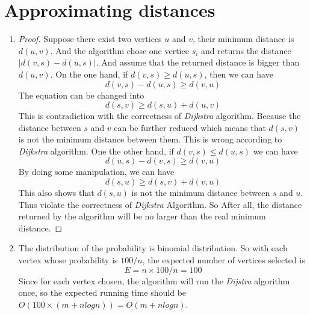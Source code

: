 \documentclass{article}
\begin{document}
	\section{Approximating distances}
		\begin{enumerate}
			\item \begin{proof}
				Suppose there exist two vertices $u$ and $v$, their minimum distance is $d(u, v)$. And the algorithm chose one vertice $s_i$ and returns the distance $|d(v, s) - d(u, s)|$. And assume that the returned distance is bigger than $d(u, v)$. On the one hand, if $d(v, s) \ge d(u, s)$, then we can have \begin{displaymath}
					d(v, s) - d(u, s) \ge d(v, u)
				\end{displaymath}
				The equation can be changed into \begin{displaymath}
					d(s, v) \ge d(s, u) + d(u, v)
				\end{displaymath}
				This is contradiction with the correctness of \emph{Dijkstra} algorithm. Because the distance between $s$ and $v$ can be further reduced which means that $d(s, v)$ is not the minimum distance between them. This is wrong according to \emph{Dijkstra} algorithm. \newline
				One the other hand, if $d(v, s) \le d(u, s)$ we can have \begin{displaymath}
					d(u, s) - d(v, s) \ge d(v, u)
				\end{displaymath}
				By doing some manipulation, we can have
				\begin{displaymath}
					d(s, u) \ge d(s, v) + d(v, u)
				\end{displaymath}
				This also shows that $d(s, u)$ is not the minimum distance between $s$ and $u$. Thus violate the correctness of \emph{Dijkstra} Algorithm. \newline
				So After all, the distance returned by the algorithm will be no larger than the real minimum distance.
			\end{proof}
			\item The distribution of the probability is binomial distribution. So with each vertex whose probability is $100 / n$, the expected number of vertices selected is \begin{displaymath}
				E = n \times 100 / n = 100
			\end{displaymath}
			Since for each vertex chosen, the algorithm will run the \emph{Dijstra} algorithm once, so the expected running time should be $O(100 \times (m + nlogn)) = O(m + nlogn)$. 

\end{enumerate}
\end{document}
